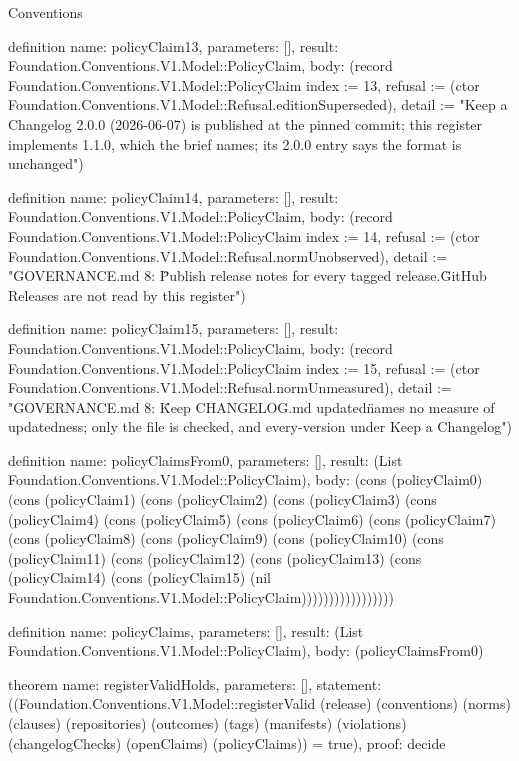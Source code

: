 \begin{lexlean}{Conventions}
\begin{semanticmodule}
definition{
  name: policyClaim13,
  parameters: [],
  result: Foundation.Conventions.V1.Model::PolicyClaim,
  body: (record Foundation.Conventions.V1.Model::PolicyClaim {index := 13, refusal := (ctor Foundation.Conventions.V1.Model::Refusal.editionSuperseded), detail := "Keep a Changelog 2.0.0 (2026-06-07) is published at the pinned commit; this register implements 1.1.0, which the brief names; its 2.0.0 entry says the format is unchanged"})
}

definition{
  name: policyClaim14,
  parameters: [],
  result: Foundation.Conventions.V1.Model::PolicyClaim,
  body: (record Foundation.Conventions.V1.Model::PolicyClaim {index := 14, refusal := (ctor Foundation.Conventions.V1.Model::Refusal.normUnobserved), detail := "GOVERNANCE.md 8: \"Publish release notes for every tagged release.\" GitHub Releases are not read by this register"})
}

definition{
  name: policyClaim15,
  parameters: [],
  result: Foundation.Conventions.V1.Model::PolicyClaim,
  body: (record Foundation.Conventions.V1.Model::PolicyClaim {index := 15, refusal := (ctor Foundation.Conventions.V1.Model::Refusal.normUnmeasured), detail := "GOVERNANCE.md 8: \"Keep CHANGELOG.md updated\" names no measure of updatedness; only the file is checked, and every-version under Keep a Changelog"})
}

definition{
  name: policyClaimsFrom0,
  parameters: [],
  result: (List Foundation.Conventions.V1.Model::PolicyClaim),
  body: (cons (policyClaim0) (cons (policyClaim1) (cons (policyClaim2) (cons (policyClaim3) (cons (policyClaim4) (cons (policyClaim5) (cons (policyClaim6) (cons (policyClaim7) (cons (policyClaim8) (cons (policyClaim9) (cons (policyClaim10) (cons (policyClaim11) (cons (policyClaim12) (cons (policyClaim13) (cons (policyClaim14) (cons (policyClaim15) (nil Foundation.Conventions.V1.Model::PolicyClaim)))))))))))))))))
}

definition{
  name: policyClaims,
  parameters: [],
  result: (List Foundation.Conventions.V1.Model::PolicyClaim),
  body: (policyClaimsFrom0)
}

theorem{
  name: registerValidHolds,
  parameters: [],
  statement: ((Foundation.Conventions.V1.Model::registerValid (release) (conventions) (norms) (clauses) (repositories) (outcomes) (tags) (manifests) (violations) (changelogChecks) (openClaims) (policyClaims)) = true),
  proof: decide{}
}
\end{semanticmodule}
\end{lexlean}
